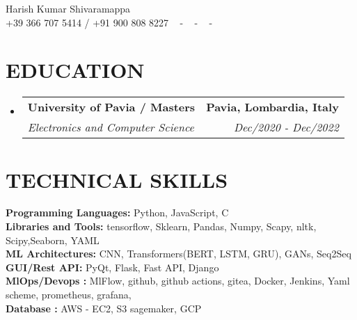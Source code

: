 \documentclass[letterpaper,11pt]{article}
\makeatletter
\newcommand{\resumeSubheading}[4]{
  \vspace{-2pt}\item
    \begin{tabular*}{1.0\textwidth}[t]{l@{\extracolsep{\fill}}r}
      \textbf{\large#1} & \textbf{\small #2} \\
      \textit{\large#3} & \textit{\small #4} \\
      
    \end{tabular*}\vspace{-7pt}
}
\newcommand{\resumeSubHeadingListStart}{\begin{itemize}[leftmargin=0.0in, label={}]}
\newcommand{\resumeSubHeadingListEnd}{\end{itemize}}
\makeatother
\begin{document}


\begin{center}
    {\huge Harish Kumar Shivaramappa } \\ \vspace{2pt} 
     {+39 366 707 5414 / +91 900 808 8227} ~ 
    \small{-}
     \href{mailto:harishkumarsedu@gmail.com}{\color{blue}{harishkumarsedu@gmail.com}} ~ 
    \small{-}
    \faLinkedin \href{https://www.linkedin.com/in/harish-kumar-shivaramappa-183292206/}{ \color{blue}{linkedin}}  ~
    \small{-}
    \faGithub \href{https://www.github.com/HarishKumarSedu}{ \color{blue}{git}} ~
     ~
    \vspace{-7pt}
\end{center}

\section{\color{airforceblue}EDUCATION \faArchway}
  \resumeSubHeadingListStart
    \resumeSubheading
      { \faIcon{university}  University of Pavia / Masters}{Pavia, Lombardia, Italy}
      {\hspace{1 cm} Electronics and Computer Science }{Dec/2020 - Dec/2022}
    \vspace{-4pt}
  \resumeSubHeadingListEnd
  \vspace{-10pt}

\section{\color{airforceblue}TECHNICAL SKILLS }
 \begin{itemize}[leftmargin=0in, label={}]
    \small{\item{
     \textbf{\normalsize{Programming Languages:}}{ \normalsize{Python, JavaScript, C}} \\
     \textbf{\normalsize{Libraries and Tools:}}{ \normalsize{tensorflow,  Sklearn, Pandas, Numpy, Scapy, nltk, Scipy,Seaborn, YAML}} \\
     \textbf{\normalsize{ML Architectures:}}{ \normalsize{CNN, Transformers(BERT, LSTM, GRU), GANs, Seq2Seq }} \\
     \textbf{\normalsize{GUI/Rest API:}}{ \normalsize{ PyQt, Flask, Fast API, Django }}\\
     \textbf{\normalsize{MlOps/Devops :}}{ \normalsize{ MlFlow, github, github actions, gitea, Docker, Jenkins, Yaml scheme, prometheus, grafana,  }}\\
     \textbf{\normalsize{Database :}}{ \normalsize{ AWS - EC2, S3 sagemaker, GCP }}\\

     }}
 \end{itemize}
 \vspace{-16pt}
\end{document}

